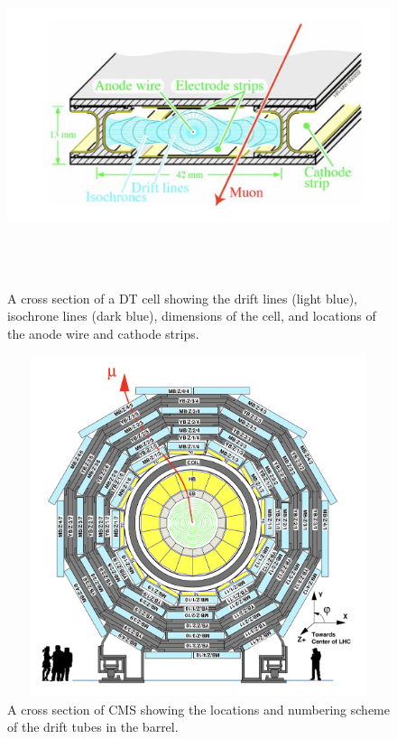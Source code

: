 \begin{figure}[pbth]
    \centering
    \includegraphics[width=15cm,height=10cm,keepaspectratio]{figures/cms/muonsys/drifttube_xs.jpeg}
        \caption{
        A cross section of a DT cell showing the drift lines (light blue), isochrone lines (dark blue), dimensions of the cell, and locations of the anode wire and cathode strips.
        }
        \label{fig:dt_cell}
\end{figure}
\begin{figure}[pbth]
    \centering
    \includegraphics[width=15cm,height=10cm,keepaspectratio]{figures/cms/muonsys/drifttube_locations.jpeg}
    \caption{
        A cross section of CMS showing the locations and numbering scheme of the drift tubes in the barrel.
        }
        \label{fig:dt_locations}
\end{figure}

